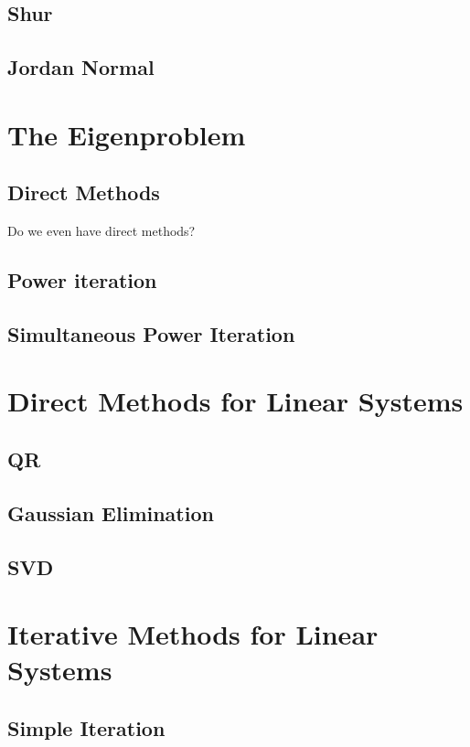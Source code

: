 \documentclass[12pt]{article}
\begin{document}
\subsection{Shur}

\subsection{Jordan Normal}

\pagebreak
\section{The Eigenproblem}
\subsection{Direct Methods}
Do we even have direct methods?

\subsection{Power iteration}


\subsection{Simultaneous Power Iteration}



\pagebreak
\section{Direct Methods for Linear Systems}
\subsection{QR}

\subsection{Gaussian Elimination}
\subsection{SVD}


\pagebreak
\section{Iterative Methods for Linear Systems}
\subsection{Simple Iteration}
\end{document}
